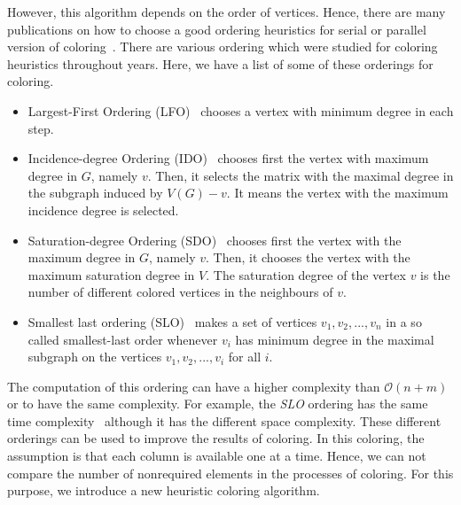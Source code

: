\documentclass[12pt, oneside]{book}
\begin{document}
However, this algorithm depends on the order of vertices. 
Hence, there are many publications on how to choose a good ordering heuristics
for serial or parallel version of coloring~\cite{ordering1,ordering2,ordering3}.
There are various ordering which were studied for coloring heuristics
throughout years. Here, we have a list of some of these orderings for coloring.
\begin{itemize}
\item Largest-First Ordering (LFO)~\cite{LFO} chooses a vertex with minimum degree in each step.
\item Incidence-degree Ordering (IDO)~\cite{IDO} chooses first the vertex with maximum degree in $G$, namely $v$. Then, it selects the matrix with the maximal degree in the subgraph induced by $V(G)-v$. It means the vertex with the maximum incidence degree is selected.
\item Saturation-degree Ordering (SDO)~\cite{SDO} chooses first the vertex with the maximum degree in $G$, namely $v$. Then, it chooses the vertex with the maximum saturation degree in
$V$. The saturation degree of the vertex $v$ is the number of different colored vertices in the neighbours of $v$.
\item Smallest last ordering (SLO)~\cite{ordering1} makes a set of vertices ${v_1,v_2,...,v_n}$ in a so called smallest-last
order whenever $v_i$ has minimum degree in the maximal subgraph on the vertices $v_1,v_2,...,v_i$ for all $i$.
\end{itemize}
The computation of this ordering can have a higher complexity than $\mathcal{O}(n+m)$
or to have the same complexity. For example, the \textit{SLO} ordering has the same time complexity~\cite{ordering1}
although it has the different space complexity.
These different orderings can be used to improve the results of coloring. 
In this coloring, the assumption is that each
column is available one at a time. Hence, we can not compare the number of 
nonrequired elements in the processes of coloring.
For this purpose, we introduce a new heuristic coloring algorithm.
\end{document}
